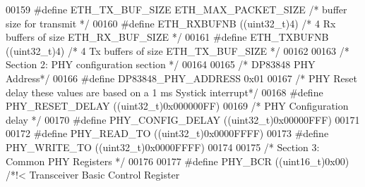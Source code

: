 \begin{DoxyCode}
00159 \textcolor{preprocessor}{#}\textcolor{preprocessor}{define} \textcolor{preprocessor}{ETH\_TX\_BUF\_SIZE}                \textcolor{preprocessor}{ETH\_MAX\_PACKET\_SIZE} \textcolor{comment}{/* buffer size for transmit              */}
00160 \textcolor{preprocessor}{#}\textcolor{preprocessor}{define} \textcolor{preprocessor}{ETH\_RXBUFNB}                    \textcolor{preprocessor}{(}\textcolor{preprocessor}{(}\textcolor{preprocessor}{uint32\_t}\textcolor{preprocessor}{)}4\textcolor{preprocessor}{)}       \textcolor{comment}{/* 4 Rx buffers of size ETH\_RX\_BUF\_SIZE  */}
00161 \textcolor{preprocessor}{#}\textcolor{preprocessor}{define} \textcolor{preprocessor}{ETH\_TXBUFNB}                    \textcolor{preprocessor}{(}\textcolor{preprocessor}{(}\textcolor{preprocessor}{uint32\_t}\textcolor{preprocessor}{)}4\textcolor{preprocessor}{)}       \textcolor{comment}{/* 4 Tx buffers of size ETH\_TX\_BUF\_SIZE  */}
00162 
00163 \textcolor{comment}{/* Section 2: PHY configuration section */}
00164 
00165 \textcolor{comment}{/* DP83848 PHY Address*/}
00166 \textcolor{preprocessor}{#}\textcolor{preprocessor}{define} \textcolor{preprocessor}{DP83848\_PHY\_ADDRESS}             0x01
00167 \textcolor{comment}{/* PHY Reset delay these values are based on a 1 ms Systick interrupt*/}
00168 \textcolor{preprocessor}{#}\textcolor{preprocessor}{define} \textcolor{preprocessor}{PHY\_RESET\_DELAY}                 \textcolor{preprocessor}{(}\textcolor{preprocessor}{(}\textcolor{preprocessor}{uint32\_t}\textcolor{preprocessor}{)}0x000000FF\textcolor{preprocessor}{)}
00169 \textcolor{comment}{/* PHY Configuration delay */}
00170 \textcolor{preprocessor}{#}\textcolor{preprocessor}{define} \textcolor{preprocessor}{PHY\_CONFIG\_DELAY}                \textcolor{preprocessor}{(}\textcolor{preprocessor}{(}\textcolor{preprocessor}{uint32\_t}\textcolor{preprocessor}{)}0x00000FFF\textcolor{preprocessor}{)}
00171 
00172 \textcolor{preprocessor}{#}\textcolor{preprocessor}{define} \textcolor{preprocessor}{PHY\_READ\_TO}                     \textcolor{preprocessor}{(}\textcolor{preprocessor}{(}\textcolor{preprocessor}{uint32\_t}\textcolor{preprocessor}{)}0x0000FFFF\textcolor{preprocessor}{)}
00173 \textcolor{preprocessor}{#}\textcolor{preprocessor}{define} \textcolor{preprocessor}{PHY\_WRITE\_TO}                    \textcolor{preprocessor}{(}\textcolor{preprocessor}{(}\textcolor{preprocessor}{uint32\_t}\textcolor{preprocessor}{)}0x0000FFFF\textcolor{preprocessor}{)}
00174 
00175 \textcolor{comment}{/* Section 3: Common PHY Registers */}
00176 
00177 \textcolor{preprocessor}{#}\textcolor{preprocessor}{define} \textcolor{preprocessor}{PHY\_BCR}                         \textcolor{preprocessor}{(}\textcolor{preprocessor}{(}\textcolor{preprocessor}{uint16\_t}\textcolor{preprocessor}{)}0x00\textcolor{preprocessor}{)}    \textcolor{comment}{/*!< Transceiver Basic Control Register  
}
\end{DoxyCode}
